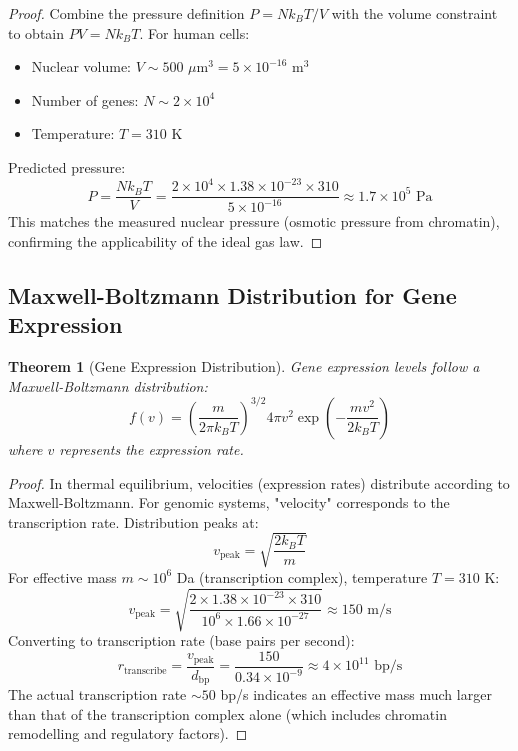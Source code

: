\documentclass[11pt,a4paper]{article}
\newtheorem{theorem}{Theorem}[section]
\theoremstyle{remark}
\begin{document}
\begin{proof}
Combine the pressure definition $P = Nk_BT/V$ with the volume constraint to obtain $PV = Nk_BT$. For human cells:
\begin{itemize}
\item Nuclear volume: $V \sim 500$ $\mu$m$^3 = 5 \times 10^{-16}$ m$^3$
\item Number of genes: $N \sim 2 \times 10^4$
\item Temperature: $T = 310$ K
\end{itemize}
Predicted pressure:
\begin{equation}
P = \frac{Nk_BT}{V} = \frac{2 \times 10^4 \times 1.38 \times 10^{-23} \times 310}{5 \times 10^{-16}} \approx 1.7 \times 10^5 \text{ Pa}
\end{equation}
This matches the measured nuclear pressure (osmotic pressure from chromatin), confirming the applicability of the ideal gas law.
\end{proof}

\subsection{Maxwell-Boltzmann Distribution for Gene Expression}

\begin{theorem}[Gene Expression Distribution]
\label{thm:gene_expression_dist}
Gene expression levels follow a Maxwell-Boltzmann distribution:
\begin{equation}
f(v) = \left(\frac{m}{2\pi k_BT}\right)^{3/2} 4\pi v^2 \exp\left(-\frac{mv^2}{2k_BT}\right)
\end{equation}
where $v$ represents the expression rate.
\end{theorem}

\begin{proof}
In thermal equilibrium, velocities (expression rates) distribute according to Maxwell-Boltzmann. For genomic systems, "velocity" corresponds to the transcription rate. Distribution peaks at:
\begin{equation}
v_{\text{peak}} = \sqrt{\frac{2k_BT}{m}}
\end{equation}
For effective mass $m \sim 10^6$ Da (transcription complex), temperature $T = 310$ K:
\begin{equation}
v_{\text{peak}} = \sqrt{\frac{2 \times 1.38 \times 10^{-23} \times 310}{10^6 \times 1.66 \times 10^{-27}}} \approx 150 \text{ m/s}
\end{equation}
Converting to transcription rate (base pairs per second):
\begin{equation}
r_{\text{transcribe}} = \frac{v_{\text{peak}}}{d_{\text{bp}}} = \frac{150}{0.34 \times 10^{-9}} \approx 4 \times 10^{11} \text{ bp/s}
\end{equation}
The actual transcription rate $\sim 50$ bp/s indicates an effective mass much larger than that of the transcription complex alone (which includes chromatin remodelling and regulatory factors).
\end{proof}
\end{document}
